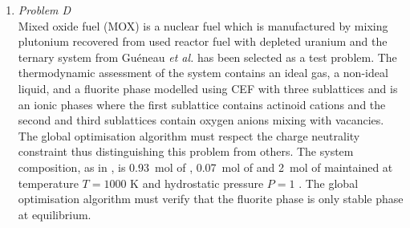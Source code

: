 \begin{enumerate}
	\item	\emph{Problem D}\\
		Mixed oxide fuel (MOX) is a nuclear fuel which is manufactured by mixing plutonium recovered from used reactor fuel with depleted uranium and the  ternary system from Gu\'{e}neau \textit{et al.} \cite{Gueneau11} has been selected as a test problem. The thermodynamic assessment of the system contains an ideal gas, a non-ideal liquid,  and a  fluorite phase modelled using CEF with three sublattices and is an ionic phases where the first sublattice contains actinoid cations and the second and third sublattices contain oxygen anions mixing with vacancies. The global optimisation algorithm must respect the charge neutrality constraint thus distinguishing this problem from others. The system composition, as in \cite{Piro16}, is \SI{0.93}{\mole} of , \SI{0.07}{\mole} of  and \SI{2}{\mole} of  maintained at temperature $T = 1000$ \si{\kelvin} and hydrostatic pressure $P=1$ \si{\atmosphere}. The global optimisation algorithm must verify that the  fluorite phase is only stable phase at equilibrium.
		

\end{enumerate}
